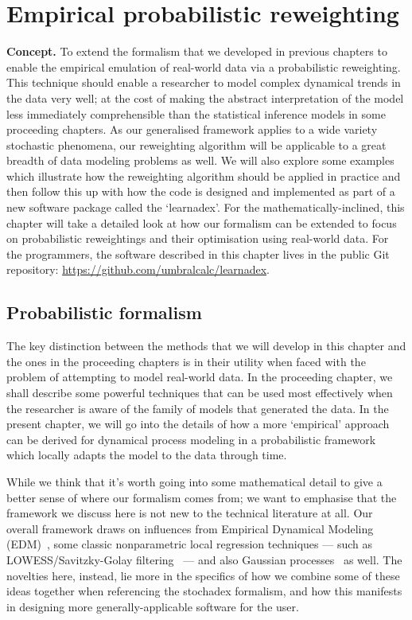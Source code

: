 \chapter{\sffamily Empirical probabilistic reweighting}

{\bfseries\sffamily Concept.} To extend the formalism that we developed in previous chapters to enable the empirical emulation of real-world data via a probabilistic reweighting. This technique should enable a researcher to model complex dynamical trends in the data very well; at the cost of making the abstract interpretation of the model less immediately comprehensible than the statistical inference models in some proceeding chapters. As our generalised framework applies to a wide variety stochastic phenomena, our reweighting algorithm will be applicable to a great breadth of data modeling problems as well. We will also explore some examples which illustrate how the reweighting algorithm should be applied in practice and then follow this up with how the code is designed and implemented as part of a new software package called the `learnadex'. For the mathematically-inclined, this chapter will take a detailed look at how our formalism can be extended to focus on probabilistic reweightings and their optimisation using real-world data. For the programmers, the software described in this chapter lives in the public Git repository: \href{https://github.com/umbralcalc/learnadex}{https://github.com/umbralcalc/learnadex}.

\section{\sffamily Probabilistic formalism}

The key distinction between the methods that we will develop in this chapter and the ones in the proceeding chapters is in their utility when faced with the problem of attempting to model real-world data. In the proceeding chapter, we shall describe some powerful techniques that can be used most effectively when the researcher is aware of the family of models that generated the data. In the present chapter, we will go into the details of how a more `empirical' approach can be derived for dynamical process modeling in a probabilistic framework which locally adapts the model to the data through time. 

While we think that it's worth going into some mathematical detail to give a better sense of where our formalism comes from; we want to emphasise that the framework we discuss here is not new to the technical literature at all. Our overall framework draws on influences from Empirical Dynamical Modeling (EDM)~\cite{sugihara1990nonlinear}, some classic nonparametric local regression techniques --- such as LOWESS/Savitzky-Golay filtering~\cite{savitzky1964smoothing} --- and also Gaussian processes~\cite{murphy2012machine} as well. The novelties here, instead, lie more in the specifics of how we combine some of these ideas together when referencing the stochadex formalism, and how this manifests in designing more generally-applicable software for the user.

